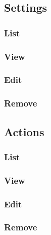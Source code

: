 \documentclass[english]{article}%
\begin{document}
\subsection{Settings}
\subsubsection{List}
\subsubsection{View}
\subsubsection{Edit}
\subsubsection{Remove}

\subsection{Actions}
\subsubsection{List}
\subsubsection{View}
\subsubsection{Edit}
\subsubsection{Remove}


\end{document}
